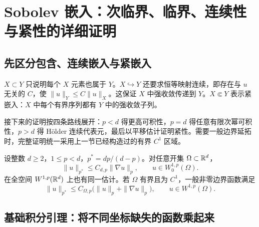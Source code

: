 \section{Sobolev 嵌入：次临界、临界、连续性与紧性的详细证明}\label{sec:sobolev-embedding}

\subsection{先区分包含、连续嵌入与紧嵌入}

$X\subset Y$ 只说明每个 $X$ 元素也属于 $Y$。$X\hookrightarrow Y$ 还要求恒等映射连续，即存在与 $u$ 无关的 $C$，使 $\|u\|_Y\le C\|u\|_X$。这保证 $X$ 中强收敛传递到 $Y$。$X\Subset Y$ 表示紧嵌入：$X$ 中每个有界序列都有 $Y$ 中的强收敛子列。

接下来的证明按四条路线展开：$p<d$ 得更高可积性，$p=d$ 得任意有限次幂可积性，$p>d$ 得 H\"older 连续代表元，最后以平移估计证明紧性。需要一般边界延拓时，完整证明统一采用上一节已经构造过的有界 $C^1$ 区域。

\begin{theorem}\label{thm:sobolev-main}
设整数 $d\ge2$，$1\le p<d$，$p^*=dp/(d-p)$。对任意开集 $\Omega\subset\mathbb R^d$，
\begin{equation}
 \boxed{\|u\|_{p^*}\le C_{d,p}\|\nabla u\|_p,
       \qquad u\in W^{1,p}_0(\Omega).}
 \label{eq:sobolev-main}
\end{equation}
在全空间 $W^{1,p}(\mathbb R^d)$ 上也有同一估计。若 $\Omega$ 有界且为 $C^1$，一般非零边界函数满足
\begin{equation}
 \|u\|_{p^*}\le C_{\Omega,p}\big(\|u\|_p+\|\nabla u\|_p\big),
 \qquad u\in W^{1,p}(\Omega).
 \label{eq:sobolev-nonzero}
\end{equation}
\end{theorem}

\subsection{基础积分引理：将不同坐标缺失的函数乘起来}

